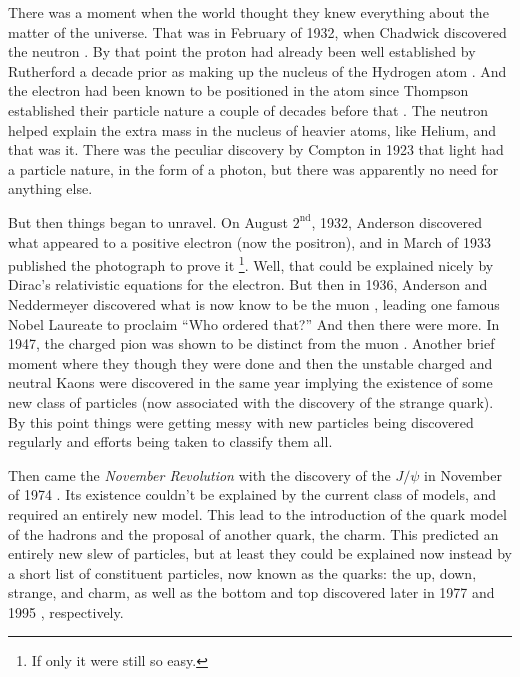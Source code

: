 There was a moment when the world thought they knew everything
about the matter of the universe. That was in February of 1932, when Chadwick discovered the
neutron \cite{Chadwick:1932ma}. By that point the proton had already been 
well established by Rutherford a decade prior as 
making up the nucleus of the Hydrogen
atom \cite{Rutherford:1911zz}. 
And the electron had been known to be positioned in the atom
since Thompson established their particle nature a couple of decades before
that \cite{thompson:electron}. 
The neutron helped explain the extra mass in the nucleus of heavier
atoms, like Helium, and that was it. There was the peculiar discovery 
by Compton in 1923 \cite{PhysRev.21.483} 
that light had a particle nature, in the form of a photon,
but there was apparently no need for anything else. 


But then things began to unravel. On August $2^{\textrm{nd}}$, 1932, Anderson
discovered what appeared to a positive electron (now the positron), 
and in March of 1933 published 
the photograph to prove it \cite{PhysRev.43.491}\footnote{If only it were still so easy.}. 
Well, that could be explained nicely by Dirac's relativistic equations
for the electron. But then in 1936, Anderson and Neddermeyer discovered
what is now know to be the muon \cite{PhysRev.51.884}, 
leading one famous Nobel Laureate
to proclaim ``Who ordered that?'' And then there were more.
In 1947, the charged pion was shown to be distinct 
from the muon \cite{Lattes:1947my}.
Another brief moment where they though they were done and then the unstable
charged and neutral Kaons were discovered in the 
same year \cite{Rochester:1947mi} implying
the existence of some new class of particles (now associated with the discovery 
of the strange quark). By this point things were getting messy with new particles
being discovered regularly and efforts being taken to classify them all.


Then came the \emph{November Revolution} with the discovery 
of the $J/\psi$ in November of 1974 \cite{PhysRevLett.33.1404,PhysRevLett.33.1453}.
Its existence couldn't be explained by the current class 
of models, and required an entirely
new model. This lead 
to the introduction of the 
quark model of the hadrons and the proposal of another quark, the charm.  
This predicted an entirely new slew of particles, but at least 
they could be explained
now instead by a short list of constituent particles, now known as the 
quarks: the up, down,
strange, and charm, as well as the bottom and top discovered later in 
1977 \cite{Herb:1977ek}
and 1995 \cite{PhysRevLett.74.2632,PhysRevLett.74.2626}, respectively.



